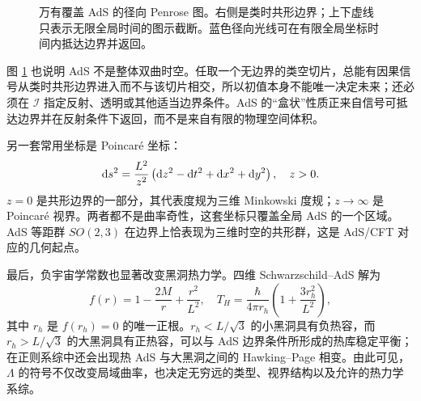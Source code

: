 \begin{figure}[htbp]
    \centering
    \caption{万有覆盖 AdS 的径向 Penrose 图。右侧是类时共形边界；上下虚线只表示无限全局时间的图示截断。蓝色径向光线可在有限全局坐标时间内抵达边界并返回。}
    \label{fig:AdS-penrose}
\end{figure}

图 \ref{fig:AdS-penrose} 也说明 AdS 不是整体双曲时空。任取一个无边界的类空切片，总能有因果信号从类时共形边界进入而不与该切片相交，所以初值本身不能唯一决定未来；还必须在 $\mathscr I$ 指定反射、透明或其他适当边界条件。AdS 的“盒状”性质正来自信号可抵达边界并在反射条件下返回，而不是来自有限的物理空间体积。

另一套常用坐标是 Poincar\'e 坐标：
\begin{equation}
    \dd s^2=\frac{L^2}{z^2}
      \left(\dd z^2-\dd t^2+\dd x^2+\dd y^2\right),
    \quad z>0.
\end{equation}
$z=0$ 是共形边界的一部分，其代表度规为三维 Minkowski 度规；$z\to\infty$ 是 Poincar\'e 视界。两者都不是曲率奇性，这套坐标只覆盖全局 AdS 的一个区域。AdS 等距群 $SO(2,3)$ 在边界上恰表现为三维时空的共形群，这是 AdS/CFT 对应的几何起点。

最后，负宇宙学常数也显著改变黑洞热力学。四维 Schwarzschild--AdS 解为
\begin{equation}
    f(r)=1-\frac{2M}{r}+\frac{r^2}{L^2},
    \quad
    T_H=\frac{\hbar}{4\pi r_h}
      \left(1+\frac{3r_h^2}{L^2}\right),
\end{equation}
其中 $r_h$ 是 $f(r_h)=0$ 的唯一正根。$r_h<L/\sqrt3$ 的小黑洞具有负热容，而 $r_h>L/\sqrt3$ 的大黑洞具有正热容，可以与 AdS 边界条件所形成的热库稳定平衡；在正则系综中还会出现热 AdS 与大黑洞之间的 Hawking--Page 相变。由此可见，$\Lambda$ 的符号不仅改变局域曲率，也决定无穷远的类型、视界结构以及允许的热力学系综。
